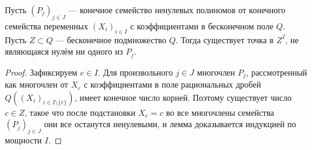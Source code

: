 \documentclass[
	extrafontsizes,
	11pt,
	hyphens,
]{memoir}
\begin{document}

\begin{lemma}
Пусть \((P_j)_{j \in J}\) --- конечное семейство ненулевых полиномов от конечного семейства переменных \((X_i)_{i \in I}\) с коэффициентами в бесконечном поле \(Q\).%
Пусть \(Z \subset Q\) --- бесконечное подмножество \(Q\).
Тогда существует точка в \(Z^I\), не являющаяся нулём ни одного из \(P_j\).
\end{lemma}

\begin{proof}
Зафиксируем \(e \in I\). Для произвольного \(j \in J\) многочлен \(P_j\), рассмотренный как многочлен от \(X_e\) с коэффициентами в поле рациональных дробей \(Q((X_i)_{i \in I \setminus \{e\}})\), имеет конечное число корней. Поэтому существует число \(c \in Z\), такое что после подстановки \(X_e = c\) во все многочлены семейства \((P_j)_{j \in J}\) они все останутся ненулевыми, и лемма доказывается индукцией по мощности \(I\).
\end{proof}


\end{document}

